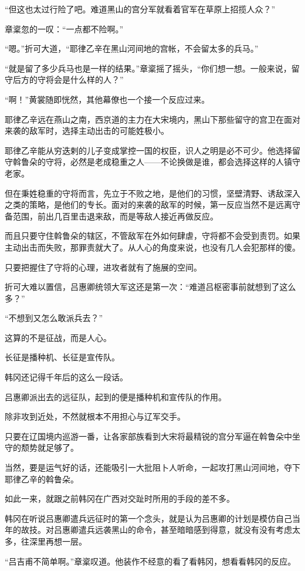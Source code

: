 “但这也太过行险了吧。难道黑山的宫分军就看着官军在草原上招揽人众？”

章楶忽的一叹：“一点都不险啊。”

“嗯。”折可大道，“耶律乙辛在黑山河间地的宫帐，不会留太多的兵马。”

“就是留了多少兵马也是一样的结果。”章楶摇了摇头，“你们想一想。一般来说，留守后方的守将会是什么样的人？”

“啊！”黄裳随即恍然，其他幕僚也一个接一个反应过来。

耶律乙辛远在燕山之南，西京道的主力在大宋境内，黑山下那些留守的宫卫在面对来袭的敌军时，选择主动出击的可能姓极小。

耶律乙辛能从穷迭剌的儿子变成掌控一国的权臣，识人之明是必不可少。他选择留守斡鲁朵的守将，必然是老成稳重之人——不论换做是谁，都会选择这样的人镇守老家。

但在秉姓稳重的守将而言，先立于不败之地，是他们的习惯，坚壁清野、诱敌深入之类的策略，是他们的专长。面对的来袭的敌军的时候，第一反应当然不是远离守备范围，前出几百里击退来敌，而是等敌人接近再做反应。

而且只要守住斡鲁朵的辖区，不管敌军在外如何肆虐，守将都不会受到责罚。如果主动出击而失败，那罪责就大了。从人心的角度来说，也没有几人会犯那样的傻。

只要把握住了守将的心理，进攻者就有了施展的空间。

折可大难以置信，吕惠卿统领大军这还是第一次：“难道吕枢密事前就想到了这么多？”

“不想到又怎么敢派兵去？”

这算的不是征战，而是人心。

长征是播种机、长征是宣传队。

韩冈还记得千年后的这么一段话。

吕惠卿派出去的远征队，起到的便是播种机和宣传队的作用。

除非攻到近处，不然就根本不用担心与辽军交手。

只要在辽国境内巡游一番，让各家部族看到大宋将最精锐的宫分军逼在斡鲁朵中坐守的颓势就足够了。

当然，要是运气好的话，还能吸引一大批阻卜人听命，一起攻打黑山河间地，夺下耶律乙辛的斡鲁朵。

如此一来，就跟之前韩冈在广西对交趾时所用的手段的差不多。

韩冈在听说吕惠卿遣兵远征时的第一个念头，就是认为吕惠卿的计划是模仿自己当年的故技。对吕惠卿遣兵远袭黑山的命令，甚至暗暗感到得意，就没有没有考虑太多，往深里再想一层。

“吕吉甫不简单啊。”章楶叹道。他装作不经意的看了看韩冈，想看看韩冈的反应。

